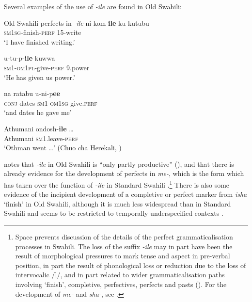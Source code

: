 \documentclass[output=paper]{langscibook}
\begin{document}
  Several examples of the use of \textit{{}-ile} are found in Old Swahili:

\ea\label{ex:marten:37}Old Swahili perfects in \textit{{}-ile}
    \ea\label{ex:marten:37a} \gll  ni-kom-\textbf{ile}         ku-kutubu \\
    \textsc{sm1sg}{}-finish-\textsc{perf}  15-write\\
    \glt ‘I have finished writing.’ \citep[179]{Miehe1979}


    \ex\label{ex:marten:37b} \gll  u-tu-p-\textbf{ile}             kuwwa\\
  \textsc{sm1-om1pl}{}-give-\textsc{perf}    9.power\\
   \glt ‘He has given us power.’ \citep[180]{Miehe1979}

    \ex\label{ex:marten:37c} \gll   na     ratabu     u-ni-p\textbf{ee} \\
    \textsc{conj}    dates      \textsc{sm1-om1sg}{}-give.\textsc{perf} \\
    \glt ‘and dates he gave me’ \citep[178]{Miehe1979}

    \ex\label{ex:marten:37d} \gll   Athumani   ondosh-\textbf{ile} \ldots\\
    Athumani   \textsc{sm1}.leave-\textsc{perf}\\
    \glt ‘Othman went \ldots’ (Chuo cha Herekali, \citealt[159]{Knappert1967}) 
    \z
\z

\citeauthor{Miehe1979} notes that \textit{{}-ile} in Old Swahili is ``only partly productive'' (\citeyear[178]{Miehe1979}), and that there is already evidence for the development of perfects in \textit{me-}, which is the form which has taken over the function of \textit{{}-ile} in Standard Swahili \citep[178]{Miehe1979}.\footnote{Space prevents discussion of the details of the perfect grammaticalisation processes in Swahili. The loss of the suffix \textit{{}-ile} may in part have been the result of morphological pressures to mark tense and aspect in pre-verbal position, in part the result of phonological loss or reduction due to the loss of intervocalic /l/, and in part related to wider grammaticalisation paths involving ‘finish’, completive, perfectives, perfects and pasts (\citealt[134--138, 231]{HeineKuteva2002}). For the development of \textit{me-} and \textit{sha-}, see \citet{Marten1998}.} There is also some evidence of the incipient development of a completive or perfect marker from \textit{{}isha} ‘finish’ in Old Swahili, although it is much less widespread than in Standard Swahili and seems to be restricted to temporally underspecified contexts \citep{Marten1998}. 
\end{document}
